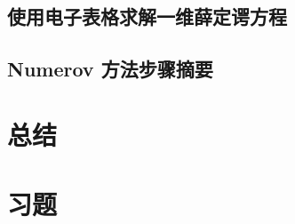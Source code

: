 \subsection*{使用电子表格求解一维薛定谔方程}

\subsection*{Numerov 方法步骤摘要}






    



\section*{总结}

\section*{习题}
